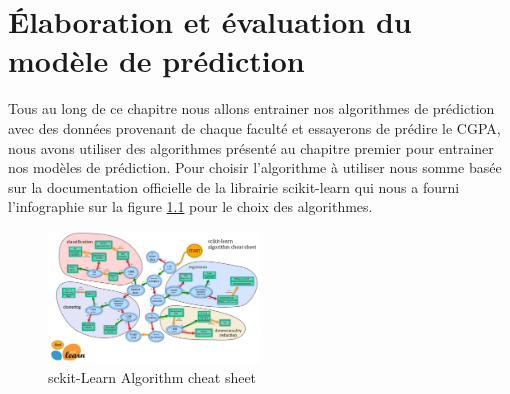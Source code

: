 \chapter{Élaboration  et évaluation du modèle de prédiction }
Tous au long de ce chapitre nous allons entrainer nos algorithmes de prédiction avec des données provenant de chaque faculté et essayerons de prédire le CGPA, nous  avons utiliser des algorithmes présenté au chapitre premier pour entrainer nos modèles de prédiction.
Pour choisir l'algorithme à utiliser nous somme basée sur la documentation officielle de la librairie scikit-learn \cite{pedregosa2011scikit} qui nous a fourni l'infographie sur la figure \ref{fig:skLearn1} pour le choix des algorithmes. \\

\begin{figure}[ht]
	\centering
	\includegraphics[width=0.5\textwidth]{fig/sckikLearnCheatSheet.png}
	\caption{sckit-Learn Algorithm cheat sheet }
	\label{fig:skLearn1}
\end{figure}  

